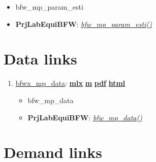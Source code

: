 \documentclass[
]{book}
\providecommand{\tightlist}{%
  \setlength{\itemsep}{0pt}\setlength{\parskip}{0pt}}
\begin{document}
\begin{enumerate}
  \begin{itemize}
  \tightlist
  \item
    bfw\_mp\_param\_esti
  \item
    \textbf{PrjLabEquiBFW}: \emph{\href{https://github.com/FanWangEcon/PrjLabEquiBFW/blob/main/PrjLabEquiBFW/paramsdata/bfw_mp_param_esti.m}{bfw\_mp\_param\_esti()}}
  \end{itemize}
\end{enumerate}

\hypertarget{data-links}{%
\section{Data links}\label{data-links}}

\begin{enumerate}
\def\labelenumi{\arabic{enumi}.}
\tightlist
\item
  \href{https://fanwangecon.github.io/PrjLabEquiBFW/PrjLabEquiBFW/doc/data/htmlpdfm/bfwx_mp_data.html}{bfwx\_mp\_data}: \href{https://github.com/FanWangEcon/PrjLabEquiBFW/blob/master/PrjLabEquiBFW/doc/data/bfwx_mp_data.mlx}{\textbf{mlx}} \textbar{} \href{https://github.com/FanWangEcon/PrjLabEquiBFW/blob/master/PrjLabEquiBFW/doc/data/htmlpdfm/bfwx_mp_data.m}{\textbf{m}} \textbar{} \href{https://github.com/FanWangEcon/PrjLabEquiBFW/blob/master/PrjLabEquiBFW/doc/data/htmlpdfm/bfwx_mp_data.pdf}{\textbf{pdf}} \textbar{} \href{https://fanwangecon.github.io/PrjLabEquiBFW/PrjLabEquiBFW/doc/data/htmlpdfm/bfwx_mp_data.html}{\textbf{html}}

  \begin{itemize}
  \tightlist
  \item
    bfw\_mp\_data
  \item
    \textbf{PrjLabEquiBFW}: \emph{\href{https://github.com/FanWangEcon/PrjLabEquiBFW/blob/main/PrjLabEquiBFW/paramsdata/bfw_mp_data.m}{bfw\_mp\_data()}}
  \end{itemize}
\end{enumerate}

\hypertarget{demand-links}{%
\section{Demand links}\label{demand-links}}
\end{document}
